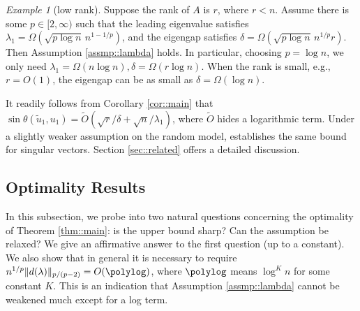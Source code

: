 \documentclass[12pt]{article}%
\theoremstyle{plain}%
\theoremstyle{remark}
\newtheorem{exm}{Example}[section]
\begin{document}
\begin{exm}[low rank]\label{exm::lowrank}
Suppose the rank of $A$ is $r$, where $r < n$. Assume there is some $p\in [2, \infty)$ such that the leading eigenvalue satisfies $\lambda_1 = \Omega(\sqrt{p \log n}\, n^{1 - 1/p})$, and the eigengap satisfies $\delta = \Omega( \sqrt{p \log n}\, n^{1/p} r )$. Then Assumption \ref{assmp::lambda} holds. In particular, choosing $p = \log n$, we only need $\lambda_1 = \Omega(n\log n), \delta = \Omega(r \log n)$. When the rank is small, e.g., $r = O(1)$, the eigengap can be as small as $\delta = \Omega(\log n)$. 

It readily follows from Corollary \ref{cor::main} that $\sin \theta(\tilde{u}_1, u_1) = \tilde{O}(\sqrt{r}/\delta + \sqrt{n}/ \lambda_1)$, where $\tilde{O}$ hides a logarithmic term. Under a slightly weaker assumption on the random model, \cite{ORVuWan13} establishes the same bound for singular vectors. Section \ref{sec::related} offers a detailed discussion.

\end{exm}
 
\subsection{Optimality Results}\label{sec::opt}
In this subsection, we probe into two natural questions concerning the optimality of Theorem \ref{thm::main}: is the upper bound sharp? Can the assumption be relaxed? We give an affirmative answer to the first question (up to a constant). We also show that in general it is necessary to require $n^{1/p} \| d(\lambda) \|_{p/(p-2)} = O(\polylog)$, where $\polylog$ means $\log^K n$ for some constant $K$. This is an indication that Assumption \ref{assmp::lambda} cannot be weakened much except for a log term.
\end{document}
